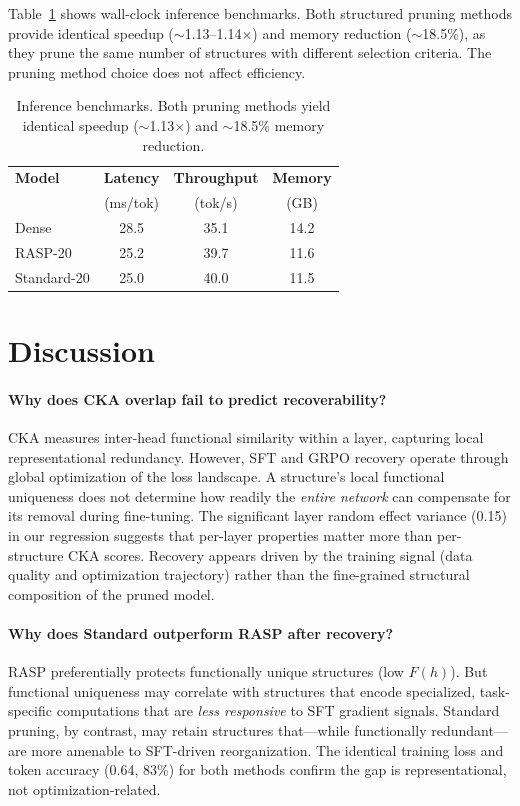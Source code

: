 \documentclass[11pt,a4paper]{article}
\begin{document}
Table~\ref{tab:speedup} shows wall-clock inference benchmarks. Both structured pruning methods provide identical speedup ($\sim$1.13--1.14$\times$) and memory reduction ($\sim$18.5\%), as they prune the same number of structures with different selection criteria. The pruning method choice does not affect efficiency.

\begin{table}[t]
\centering
\small
\begin{tabular}{lccc}
\toprule
\textbf{Model} & \textbf{Latency} & \textbf{Throughput} & \textbf{Memory} \\
& (ms/tok) & (tok/s) & (GB) \\
\midrule
Dense & 28.5 & 35.1 & 14.2 \\
RASP-20 & 25.2 & 39.7 & 11.6 \\
Standard-20 & 25.0 & 40.0 & 11.5 \\
\bottomrule
\end{tabular}
\caption{Inference benchmarks. Both pruning methods yield identical speedup ($\sim$1.13$\times$) and $\sim$18.5\% memory reduction.}
\label{tab:speedup}
\end{table}


\section{Discussion}
\label{sec:discussion}

\paragraph{Why does CKA overlap fail to predict recoverability?}
CKA measures inter-head functional similarity within a layer, capturing local representational redundancy. However, SFT and GRPO recovery operate through global optimization of the loss landscape. A structure's local functional uniqueness does not determine how readily the \emph{entire network} can compensate for its removal during fine-tuning. The significant layer random effect variance (0.15) in our regression suggests that per-layer properties matter more than per-structure CKA scores. Recovery appears driven by the training signal (data quality and optimization trajectory) rather than the fine-grained structural composition of the pruned model.

\paragraph{Why does Standard outperform RASP after recovery?}
RASP preferentially protects functionally unique structures (low $F(h)$). But functional uniqueness may correlate with structures that encode specialized, task-specific computations that are \emph{less responsive} to SFT gradient signals. Standard pruning, by contrast, may retain structures that---while functionally redundant---are more amenable to SFT-driven reorganization. The identical training loss and token accuracy (0.64, 83\%) for both methods confirm the gap is representational, not optimization-related.
\end{document}
